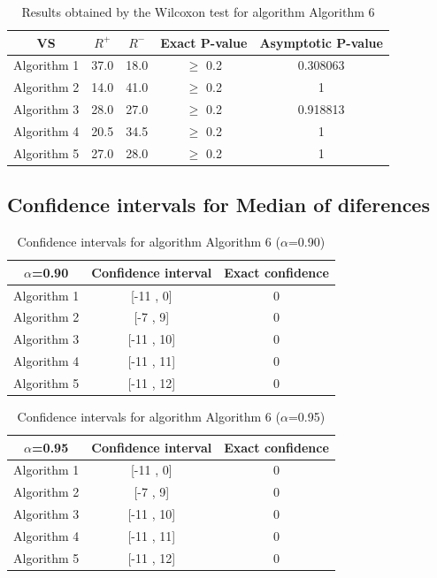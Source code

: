 \documentclass[a4paper,10pt]{article}
\begin{document}
\begin{table}[!htp]
\centering\small
\begin{tabular}{
|c|c|c|c|c|}
\hline
 VS & $R^{+}$ & $R^{-}$ & Exact P-value & Asymptotic P-value \\ \hline 
Algorithm 1 & 37.0 & 18.0 & $\geq$ 0.2 & 0.308063\\ \hline 
Algorithm 2 & 14.0 & 41.0 & $\geq$ 0.2 & 1\\ \hline 
Algorithm 3 & 28.0 & 27.0 & $\geq$ 0.2 & 0.918813\\ \hline 
Algorithm 4 & 20.5 & 34.5 & $\geq$ 0.2 & 1\\ \hline 
Algorithm 5 & 27.0 & 28.0 & $\geq$ 0.2 & 1\\ \hline 

\end{tabular}
\caption{Results obtained by the Wilcoxon test for algorithm Algorithm 6}
\end{table}

\subsection{Confidence intervals for Median of diferences}

\begin{table}[!htp]
\centering\small
\begin{tabular}{
|c|c|c|}
\hline
 $\alpha$=0.90 & Confidence interval & Exact confidence \\ \hline 
Algorithm 1 & [-11 , 0] & 0\\ \hline 
Algorithm 2 & [-7 , 9] & 0\\ \hline 
Algorithm 3 & [-11 , 10] & 0\\ \hline 
Algorithm 4 & [-11 , 11] & 0\\ \hline 
Algorithm 5 & [-11 , 12] & 0\\ \hline 

\end{tabular}
\caption{Confidence intervals for algorithm Algorithm 6 ($\alpha$=0.90)}
\end{table}
\begin{table}[!htp]
\centering\small
\begin{tabular}{
|c|c|c|}
\hline
 $\alpha$=0.95 & Confidence interval & Exact confidence \\ \hline 
Algorithm 1 & [-11 , 0] & 0\\ \hline 
Algorithm 2 & [-7 , 9] & 0\\ \hline 
Algorithm 3 & [-11 , 10] & 0\\ \hline 
Algorithm 4 & [-11 , 11] & 0\\ \hline 
Algorithm 5 & [-11 , 12] & 0\\ \hline 

\end{tabular}
\caption{Confidence intervals for algorithm Algorithm 6 ($\alpha$=0.95)}
\end{table}

 \clearpage 
\end{document}
